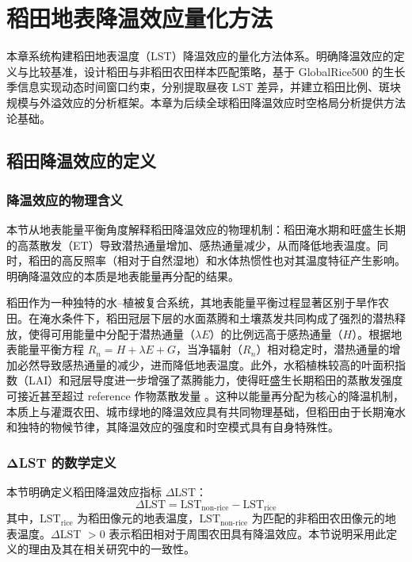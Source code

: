 \chapter{稻田地表降温效应量化方法}

本章系统构建稻田地表温度（LST）降温效应的量化方法体系。明确降温效应的定义与比较基准，设计稻田与非稻田农田样本匹配策略，基于 GlobalRice500 的生长季信息实现动态时间窗口约束，分别提取昼夜 LST 差异，并建立稻田比例、斑块规模与外溢效应的分析框架。本章为后续全球稻田降温效应时空格局分析提供方法论基础。

\section{稻田降温效应的定义}

\subsection{降温效应的物理含义}

本节从地表能量平衡角度解释稻田降温效应的物理机制：稻田淹水期和旺盛生长期的高蒸散发（ET）导致潜热通量增加、感热通量减少，从而降低地表温度。同时，稻田的高反照率（相对于自然湿地）和水体热惯性也对其温度特征产生影响。明确降温效应的本质是地表能量再分配的结果。

稻田作为一种独特的水--植被复合系统，其地表能量平衡过程显著区别于旱作农田。在淹水条件下，稻田冠层下层的水面蒸腾和土壤蒸发共同构成了强烈的潜热释放，使得可用能量中分配于潜热通量（$\lambda E$）的比例远高于感热通量（$H$）\cite{Xue2021RemoteSensing}。根据地表能量平衡方程 $R_n = H + \lambda E + G$，当净辐射（$R_n$）相对稳定时，潜热通量的增加必然导致感热通量的减少，进而降低地表温度。此外，水稻植株较高的叶面积指数（LAI）和冠层导度进一步增强了蒸腾能力，使得旺盛生长期稻田的蒸散发强度可接近甚至超过 reference 作物蒸散发量 \cite{Weng2025}。这种以能量再分配为核心的降温机制，本质上与灌溉农田、城市绿地的降温效应具有共同物理基础，但稻田由于长期淹水和独特的物候节律，其降温效应的强度和时空模式具有自身特殊性。

\subsection{ΔLST 的数学定义}

本节明确定义稻田降温效应指标 $\Delta$LST：
\begin{equation}
    \Delta \text{LST} = \text{LST}_{\text{non-rice}} - \text{LST}_{\text{rice}}
\end{equation}
其中，$\text{LST}_{\text{rice}}$ 为稻田像元的地表温度，$\text{LST}_{\text{non-rice}}$ 为匹配的非稻田农田像元的地表温度。$\Delta$LST $> 0$ 表示稻田相对于周围农田具有降温效应。本节说明采用此定义的理由及其在相关研究中的一致性。

